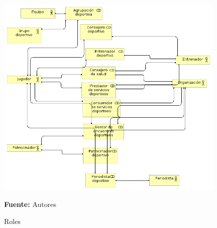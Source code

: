 \begin{figure}[!htb]
  \begin{center}
    \includegraphics[width=11cm]{./imagenes/roles.png}
    \caption{Roles}
    \label{fig:Roles}
    \textbf{Fuente:}  Autores
  \end{center}
\end{figure}

